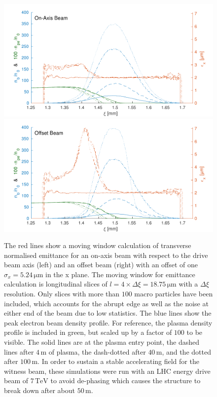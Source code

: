 \documentclass[aps,prstab,reprint,amsmath,amssymb,groupedaddress]{revtex4-1}
\newcommand{\unit}[1]{\,\mathrm{#1}}
\begin{document}
\begin{figure}[hbt]
    \includegraphics[width=0.495\linewidth,trim={2mm 0mm 2mm 0mm},clip]{figures/beamEmittance}
    \includegraphics[width=0.495\linewidth,trim={2mm 0mm 2mm 0mm},clip]{figures/beamEmittanceOffset}
    \caption{\label{Fig:BeamEmitt} The red lines show a moving window calculation of transverse normalised emittance for
        an on-axis beam with respect to the drive beam axis (left) and an offset beam (right) with an offset of one
        $\sigma_{x} = 5.24\unit{\mu m}$ in the x plane. The moving window for emittance calculation is longitudinal
        slices of $l = 4\times\Delta\xi = 18.75\unit{\mu m}$ with a $\Delta\xi$ resolution. Only slices with more than
        $100$ macro particles have been included, which accounts for the abrupt edge as well as the noise at either end
        of the beam due to low statistics. The blue lines show the peak electron beam density profile. For reference,
        the plasma density profile is included in green, but scaled up by a factor of $100$ to be visible. The solid
        lines are at the plasma entry point, the dashed lines after $4\unit{m}$ of plasma, the dash-dotted after
        $40\unit{m}$, and the dotted after $100\unit{m}$. In order to sustain a stable accelerating field for the
        witness beam, these simulations were run with an LHC energy drive beam of $7\unit{TeV}$ to avoid de-phasing
        which causes the structure to break down after about $50\unit{m}$.}
\end{figure}
\end{document}
